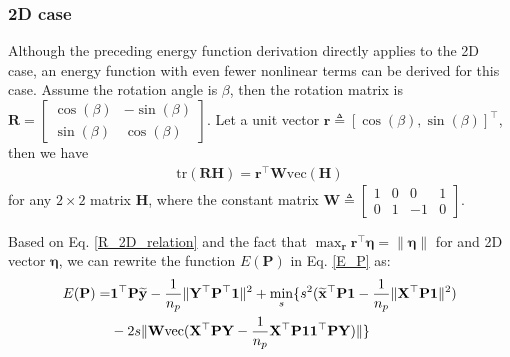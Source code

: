 \documentclass[11pt,bezier,]{article}
\begin{document}
         
\subsubsection{2D case}
Although the preceding energy function derivation  directly applies to the 2D case,
an energy function with even fewer nonlinear terms
 can be derived for this case.
Assume the  rotation angle is $\beta$, 
then the rotation matrix is
$
 \mathbf R=\begin{bmatrix}
    \cos(\beta)& -\sin(\beta)\\ \sin(\beta) & \cos(\beta)
   \end{bmatrix}
$.
Let a unit vector $\mathbf r\triangleq [\cos(\beta),\sin(\beta)]^\top$,
then we have
\begin{gather}
\text{tr}(\mathbf R\mathbf H)=\mathbf r^\top \mathbf W \text{vec}(\mathbf H) \label{R_2D_relation}
\end{gather}
for any $2\times 2$ matrix $\mathbf H$,
where the constant matrix
 $\mathbf W\triangleq \begin{bmatrix}
            1 &0 &0& 1\\0 &1 &-1 &0
           \end{bmatrix}$.

Based on Eq. \eqref{R_2D_relation} and the fact that
$\max_{\mathbf r} \mathbf r^\top \boldsymbol\eta =\|\boldsymbol\eta\|$
for and 2D vector $\boldsymbol\eta$, 
we can rewrite the function $E(\mathbf P)$ in Eq. \eqref{E_P} as:
\begin{align}
 E(\mathbf P)=&
\mathbf 1^\top\mathbf P\mathbf { \widetilde y} 
- \frac{1}{n_p} \|\mathbf Y^\top\mathbf P^\top\mathbf  1\|^2  %
+ \min_{s} \{s^2 (\mathbf {\widetilde x}^\top\mathbf P\mathbf  1   - \frac{1}{n_p}    \| \mathbf X^\top\mathbf P\mathbf  1\|^2)  \notag\\
& - 2s \| \mathbf W \text{vec}(\mathbf X^\top\mathbf P \mathbf Y - \frac{1}{n_p} \mathbf X^\top\mathbf P\mathbf 1 \mathbf 1^\top\mathbf P\mathbf Y)\|  \}
\end{align}
\end{document}
